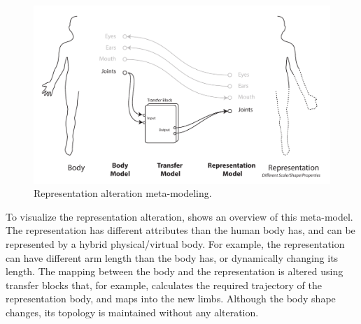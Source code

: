 \begin{figure}[h!]
  \centering
  \captionsetup{justification=centering}
\includegraphics[width=1\textwidth]{figures/concept/EDD-RepAlt.pdf}
\caption{Representation alteration meta-modeling.}
  \label{fig:concept-EDD-RepAlt}
\end{figure}




To visualize the representation alteration,  shows an overview of this meta-model. The representation has different attributes than the human body has, and can be represented by a hybrid physical/virtual body. For example, the representation can have different arm length than the body has, or dynamically changing its length. The mapping between the body and the representation is altered using transfer blocks that, for example, calculates the required trajectory of the representation body, and maps into the new limbs. Although the body shape changes, its topology is maintained without any alteration.

